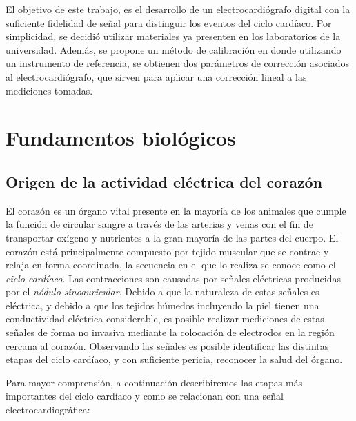 \documentclass[conference]{IEEEtran}
\begin{document}
 
El objetivo de este trabajo, es el desarrollo de un electrocardiógrafo digital con la
suficiente fidelidad de señal para distinguir los eventos del ciclo cardíaco.
Por simplicidad, se decidió utilizar materiales ya presenten en los laboratorios de la
universidad. Además, se propone un método de calibración en donde utilizando un
instrumento de referencia, se obtienen dos parámetros de corrección asociados al electrocardiógrafo, que sirven para aplicar una corrección lineal a las mediciones tomadas.

\section{Fundamentos biológicos}

\subsection{Origen de la actividad eléctrica del corazón}

El corazón es un órgano vital presente en la mayoría de los animales que cumple la
función de circular sangre a través de las arterias y venas con el fin de
transportar oxígeno y nutrientes a la gran mayoría de las partes del cuerpo.
El corazón está principalmente compuesto por tejido muscular que se contrae y relaja
en forma coordinada, la secuencia en el que lo realiza se conoce como el
\textit{ciclo cardíaco}. Las contracciones son causadas por señales eléctricas
producidas por el \textit{nódulo sinoauricular}. Debido a que la naturaleza de estas
señales es eléctrica, y debido a que los tejidos húmedos incluyendo la piel tienen
una conductividad eléctrica considerable, es posible realizar mediciones de estas
señales de forma no invasiva mediante la colocación de electrodos en la región
cercana al corazón. Observando las señales es posible identificar las distintas
etapas del ciclo cardíaco, y con suficiente pericia, reconocer la salud del órgano.


Para mayor comprensión, a continuación describiremos las etapas más importantes del
ciclo cardíaco y como se relacionan con una señal electrocardiográfica:
\cite{ecg_workings}
\end{document}
